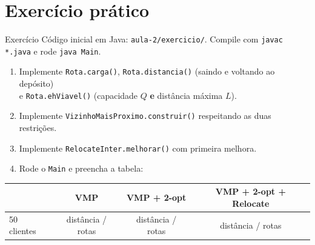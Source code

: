 \documentclass[aspectratio=169,xcolor=table]{beamer}
\begin{document}
\section{Exercício prático}

\begin{frame}{Exercício}
  Código inicial em Java: \texttt{aula-2/exercicio/}. Compile com \texttt{javac *.java} e rode \texttt{java Main}.
  \vspace{0.5em}
  \begin{enumerate}
    \item Implemente \texttt{Rota.carga()}, \texttt{Rota.distancia()} (\alert{saindo e voltando ao depósito})\\
      e \texttt{Rota.ehViavel()} (capacidade $Q$ \textbf{e} distância máxima $L$).\\
    \item Implemente \texttt{VizinhoMaisProximo.construir()} respeitando as duas restrições.
    \item Implemente \texttt{RelocateInter.melhorar()} com primeira melhora.\\
    \item Rode o \texttt{Main} e preencha a tabela:
  \end{enumerate}
  \begin{center}
  \small
  \begin{tabular}{lccc}
    \toprule
    & VMP & VMP + 2-opt & VMP + 2-opt + Relocate \\
    \midrule
    50 clientes & distância / rotas & distância / rotas & distância / rotas \\
    \bottomrule
  \end{tabular}
  \end{center}
\end{frame}
\end{document}
